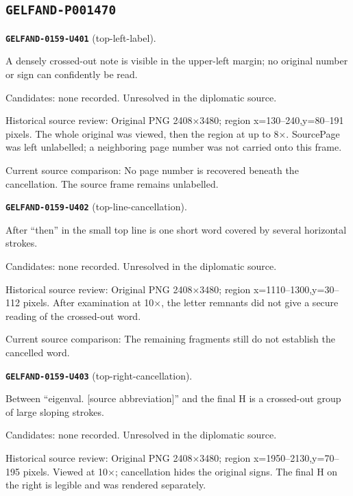 \subsection*{\texttt{GELFAND-P001470}}
\par\noindent\leavevmode{}\label{GELFAND-0159-U401}\label{GELFAND-P001470:top-left-label}\textbf{\texttt{GELFAND-0159-U401}} (top-left-label).\nopagebreak[4]\par
A densely crossed-out note is visible in the upper-left margin; no original number or sign can confidently be read.\par
Candidates: none recorded. Unresolved in the diplomatic source.\par
Historical source review: Original PNG 2408×3480; region x=130–240,y=80–191 pixels. The whole original was viewed, then the region at up to 8×. SourcePage was left unlabelled; a neighboring page number was not carried onto this frame.\par
Current source comparison: No page number is recovered beneath the cancellation. The source frame remains unlabelled.\par\medskip
\par\noindent\leavevmode{}\label{GELFAND-0159-U402}\label{GELFAND-P001470:top-line-cancellation}\textbf{\texttt{GELFAND-0159-U402}} (top-line-cancellation).\nopagebreak[4]\par
After “then” in the small top line is one short word covered by several horizontal strokes.\par
Candidates: none recorded. Unresolved in the diplomatic source.\par
Historical source review: Original PNG 2408×3480; region x=1110–1300,y=30–112 pixels. After examination at 10×, the letter remnants did not give a secure reading of the crossed-out word.\par
Current source comparison: The remaining fragments still do not establish the cancelled word.\par\medskip
\par\noindent\leavevmode{}\label{GELFAND-0159-U403}\label{GELFAND-P001470:top-right-cancellation}\textbf{\texttt{GELFAND-0159-U403}} (top-right-cancellation).\nopagebreak[4]\par
Between “eigenval. [source abbreviation]” and the final H is a crossed-out group of large sloping strokes.\par
Candidates: none recorded. Unresolved in the diplomatic source.\par
Historical source review: Original PNG 2408×3480; region x=1950–2130,y=70–195 pixels. Viewed at 10×; cancellation hides the original signs. The final H on the right is legible and was rendered separately.\par
